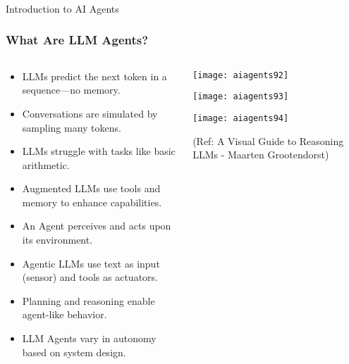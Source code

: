 \begin{frame}[fragile]\frametitle{}
\begin{center}
{\Large Introduction to AI Agents}
\end{center}
\end{frame}

\begin{frame}[fragile]\frametitle{What Are LLM Agents?}
\begin{columns}
    \begin{column}[T]{0.6\linewidth}
      \begin{itemize}
        \item LLMs predict the next token in a sequence—no memory.
        \item Conversations are simulated by sampling many tokens.
        \item LLMs struggle with tasks like basic arithmetic.
        \item Augmented LLMs use tools and memory to enhance capabilities.
        \item An Agent perceives and acts upon its environment.
        \item Agentic LLMs use text as input (sensor) and tools as actuators.
        \item Planning and reasoning enable agent-like behavior.
        \item LLM Agents vary in autonomy based on system design.
      \end{itemize}
    \end{column}
    \begin{column}[T]{0.4\linewidth}
        \begin{center}
        \texttt{[image: aiagents92]}
		
        \texttt{[image: aiagents93]}
		
        \texttt{[image: aiagents94]}
		
        {\tiny (Ref: A Visual Guide to Reasoning LLMs - Maarten Grootendorst)}
        \end{center}
    \end{column}
\end{columns}
\end{frame}


